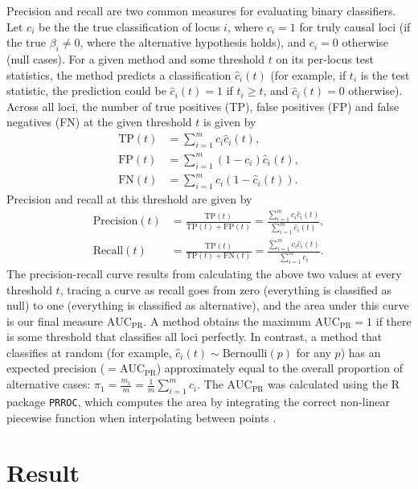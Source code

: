 \documentclass[11pt]{article}
\newcommand{\auc}{\text{AUC}_\text{PR}}
\begin{document}
Precision and recall are two common measures for evaluating binary classifiers.
Let $c_i$ be the the true classification of locus $i$, where $c_i = 1$ for truly causal loci (if the true $\beta_i \ne 0$, where the alternative hypothesis holds), and $c_i = 0$ otherwise (null cases).
For a given method and some threshold $t$ on its per-locus test statistics, the method predicts a classification $\hat{c}_i(t)$ (for example, if $t_i$ is the test statistic, the prediction could be $\hat{c}_i(t) = 1$ if $t_i \ge t$, and $\hat{c}_i(t) = 0$ otherwise).
Across all loci, the number of true positives (TP), false positives (FP) and false negatives (FN) at the given threshold $t$ is given by
\begin{align*}
  \text{TP}(t)
  &=
    \sum_{i = 1}^m c_i \hat{c}_i(t)
    , \\
  \text{FP}(t)
  &=
    \sum_{i = 1}^m (1 - c_i) \hat{c}_i(t)
    , \\
  \text{FN}(t)
  &=
    \sum_{i = 1}^m c_i \left( 1 - \hat{c}_i(t) \right)
    .
\end{align*}
Precision and recall at this threshold are given by
\begin{align*}
  \text{Precision}(t)
  &=
    \frac{ \text{TP}(t) }{ \text{TP}(t) + \text{FP}(t) }
    =
    \frac{ \sum_{i = 1}^m c_i \hat{c}_i(t) }{ \sum_{i = 1}^m \hat{c}_i(t) }
    , \\
  \text{Recall}(t)
  &=
    \frac{ \text{TP}(t) }{ \text{TP}(t) + \text{FN}(t) }
    =
    \frac{ \sum_{i = 1}^m c_i \hat{c}_i(t) }{ \sum_{i = 1}^m c_i }
    .
\end{align*}
The precision-recall curve results from calculating the above two values at every threshold $t$, tracing a curve as recall goes from zero (everything is classified as null) to one (everything is classified as alternative), and the area under this curve is our final measure $\auc$.
A method obtains the maximum $\auc = 1$ if there is some threshold that classifies all loci perfectly.
In contrast, a method that classifies at random (for example, $\hat{c}_i(t) \sim \text{Bernoulli}(p)$ for any $p$) has an expected precision ($= \auc$) approximately equal to the overall proportion of alternative cases:
$\pi_1 = \frac{m_1}{m} = \frac{1}{m} \sum_{i = 1}^m c_i$.
The $\auc$ was calculated using the R package \texttt{PRROC}, which computes the area by integrating the correct non-linear piecewise function when interpolating between points \citep{grau_prroc:_2015}.



\section{Result}
\end{document}
